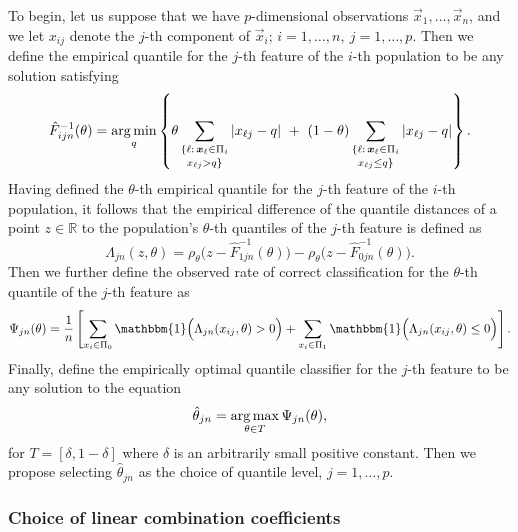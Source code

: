 To begin, let us suppose that we have $p$-dimensional observations
$\vec{x}_1, \dots, \vec{x}_n$, and we let $x_{ij}$ denote the $j$-th component
of $\vec{x}_i$; $i = 1, \dots, n,~ j = 1, \dots, p$.  Then we define the
empirical quantile for the $j$-th feature of the $i$-th population to be any
solution satisfying
\begin{equation}
  \label{eq:multivariate-empirical-quantile}
  \hat{F}_{ijn}^{-1} (\theta) = \operatorname*{arg\,min}_q \left\{
    \theta \sum_{\substack{ \{ \ell:\, \bm{x}_{\ell} \in \Pi_i  \\[0.5mm] x_{\ell j} > q \} }}
    |x_{\ell j} - q| ~+~
    (1 - \theta)
    \sum_{\substack{ \{ \ell:\, \bm{x}_{\ell} \in \Pi_i  \\[0.5mm] x_{\ell j} \leq q \} }}
    |x_{\ell j} - q|
  \right\}.
\end{equation}
Having defined the $\theta$-th empirical quantile for the $j$-th feature of the
$i$-th population, it follows that the empirical difference of the quantile
distances of a point $z \in \mathbb{R}$ to the population's $\theta$-th
quantiles of the $j$-th feature is defined as
\[
  \Lambda_{jn} (z, \theta) =
  \rho_{\theta}\Big(z - \hat{F}_{1jn}^{-1}(\theta)\Big) -
  \rho_{\theta}\Big(z - \hat{F}_{0jn}^{-1}(\theta)\Big).
\]
Then we further define the observed rate of correct classification for the
$\theta$-th quantile of the $j$-th feature as
\begin{equation}
  \Psi_{jn}(\theta) = \frac{1}{n}
  \left[
    \sum_{x_i \in \Pi_0}
    \mathbbm{1}\Big( \Lambda_{jn}(x_{ij}, \theta) > 0 \Big) +
    \sum_{x_i \in \Pi_1}
    \mathbbm{1}\Big( \Lambda_{jn}(x_{ij}, \theta) \leq 0 \Big)
  \right].
\end{equation}
Finally, define the empirically optimal quantile classifier for the $j$-th
feature to be any solution to the equation
\begin{equation}
  \hat{\theta}_{jn} = \operatorname*{arg\,max}_{\theta \in T} \Psi_{jn}(\theta),
\end{equation}
for $T = [ \delta, 1 - \delta]$ where $\delta$ is an arbitrarily small positive
constant.  Then we propose selecting $\hat{\theta}_{jn}$ as the choice of
quantile level, $j = 1, \dots, p$.




\subsubsection{Choice of linear combination coefficients}
\label{sec:variable-coefficients}


